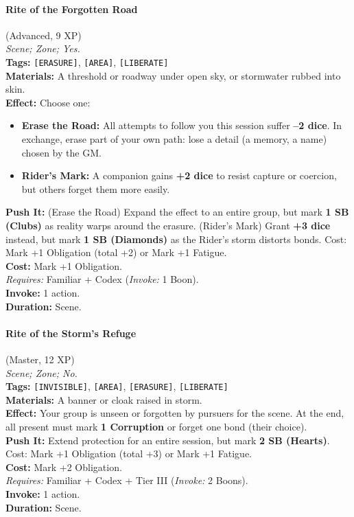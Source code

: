 \paragraph{Rite of the Forgotten Road} (Advanced, 9 XP) \hfill \\
\emph{Scene; Zone; Yes.} \\
\textbf{Tags:} \texttt{[ERASURE]}, \texttt{[AREA]}, \texttt{[LIBERATE]} \\
\textbf{Materials:} A threshold or roadway under open sky, or stormwater rubbed into skin. \\
\textbf{Effect:} Choose one:
\begin{itemize}
  \item \textbf{Erase the Road:} All attempts to follow you this session suffer \textbf{--2 dice}. In exchange, erase part of your own path: lose a detail (a memory, a name) chosen by the GM.
  \item \textbf{Rider's Mark:} A companion gains \textbf{+2 dice} to resist capture or coercion, but others forget them more easily.
\end{itemize}
\textbf{Push It:} (Erase the Road) Expand the effect to an entire group, but mark \textbf{1 SB (Clubs)} as reality warps around the erasure. (Rider's Mark) Grant \textbf{+3 dice} instead, but mark \textbf{1 SB (Diamonds)} as the Rider's storm distorts bonds. Cost: Mark +1 Obligation (total +2) or Mark +1 Fatigue. \\
\textbf{Cost:} Mark +1 Obligation. \\
\textit{Requires:} Familiar + Codex (\textit{Invoke:} 1 Boon). \\
\textbf{Invoke:} 1 action. \\
\textbf{Duration:} Scene.

\paragraph{Rite of the Storm's Refuge} (Master, 12 XP) \hfill \\
\emph{Scene; Zone; No.} \\
\textbf{Tags:} \texttt{[INVISIBLE]}, \texttt{[AREA]}, \texttt{[ERASURE]}, \texttt{[LIBERATE]} \\
\textbf{Materials:} A banner or cloak raised in storm. \\
\textbf{Effect:} Your group is unseen or forgotten by pursuers for the scene. At the end, all present must mark \textbf{1 Corruption} or forget one bond (their choice). \\
\textbf{Push It:} Extend protection for an entire session, but mark \textbf{2 SB (Hearts)}. Cost: Mark +1 Obligation (total +3) or Mark +1 Fatigue. \\
\textbf{Cost:} Mark +2 Obligation. \\
\textit{Requires:} Familiar + Codex + Tier III (\textit{Invoke:} 2 Boons). \\
\textbf{Invoke:} 1 action. \\
\textbf{Duration:} Scene.

